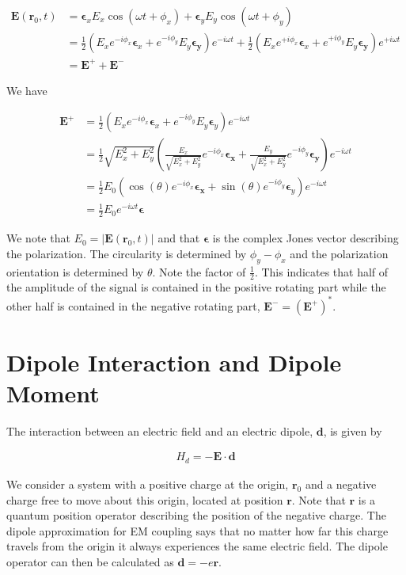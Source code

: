 \documentclass[12pt]{article}
\newcommand{\bv}[1]{\boldsymbol{#1}}
\begin{document}
\begin{align}
\bv{E}(\bv{r}_0,t) &= \bv{\epsilon}_x E_x \cos(\omega t+\phi_x) + \bv{\epsilon}_y E_y \cos(\omega t + \phi_y)\\
&= \frac{1}{2}(E_xe^{-i\phi_x}\bv{\epsilon}_x+e^{-i\phi_y}E_y\bv{\epsilon_y})e^{-i\omega t} + \frac{1}{2}(E_xe^{+i\phi_x}\bv{\epsilon}_x+e^{+i\phi_y}E_y\bv{\epsilon_y})e^{+i\omega t}\\
&= \bv{E}^+ + \bv{E}^-
\end{align}

We have

\begin{align}
\bv{E}^+ &= \frac{1}{2}\left(E_xe^{-i\phi_x}\bv{\epsilon}_x + e^{-i\phi_y}E_y\bv{\epsilon}_y\right) e^{-i\omega t}\\
&= \frac{1}{2}\sqrt{E_x^2+E_y^2}\left(\frac{E_x}{\sqrt{E_x^2+E_y^2}} e^{-i\phi_x}\bv{\epsilon_x} + \frac{E_y}{\sqrt{E_x^2+E_y^2}} e^{-i\phi_y}\bv{\epsilon_y} \right) e^{-i\omega t}\\
&= \frac{1}{2}E_0 \left(\cos(\theta) e^{-i\phi_x}\bv{\epsilon_x} + \sin(\theta)e^{-i\phi_y} \bv{\epsilon}_y \right) e^{-i\omega t}\\
&= \frac{1}{2}E_0  e^{-i\omega t} \bv{\epsilon}
\end{align}

We note that $E_0 = \lvert \bv{E}(\bv{r}_0,t) \rvert$ and that $\bv{\epsilon}$ is the complex Jones vector describing the polarization. The circularity is determined by $\phi_y-\phi_x$ and the polarization orientation is determined by $\theta$. Note the factor of $\frac{1}{2}$. This indicates that half of the amplitude of the signal is contained in the positive rotating part while the other half is contained in the negative rotating part, $\bv{E}^- = (\bv{E}^{+})^*$.

\section{Dipole Interaction and Dipole Moment}

The interaction between an electric field and an electric dipole, $\bv{d}$, is given by

\begin{align}
H_d = -\bv{E} \cdot \bv{d}
\end{align}

We consider a system with a positive charge at the origin, $\bv{r}_0$ and a negative charge free to move about this origin, located at position $\bv{r}$. Note that $\bv{r}$ is a quantum position operator describing the position of the negative charge. The dipole approximation for EM coupling says that no matter how far this charge travels from the origin it always experiences the same electric field. The dipole operator can then be calculated as $\bv{d} = -e \bv{r}$.
\end{document}
